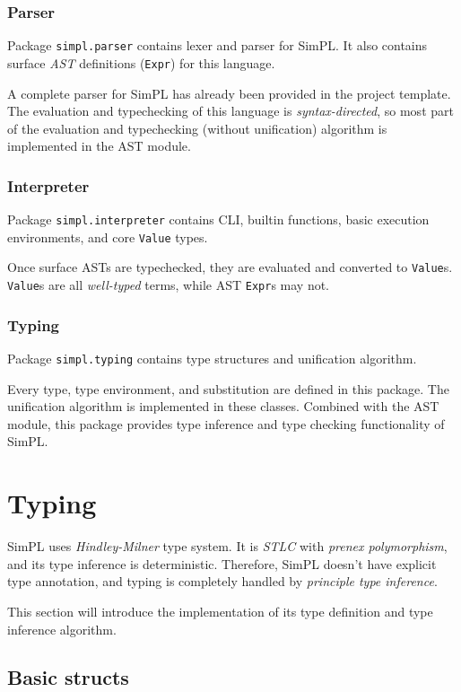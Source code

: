 \documentclass[a4paper]{article}
\begin{document}
\subsubsection{Parser}
Package \texttt{simpl.parser} contains lexer and parser for SimPL. It also contains surface \textit{AST} definitions (\texttt{Expr}) for this language.

A complete parser for SimPL has already been provided in the project template.
The evaluation and typechecking of this language is \textit{syntax-directed}, so most part of the evaluation and typechecking (without unification) algorithm is implemented in the AST module.

\subsubsection{Interpreter}
Package \texttt{simpl.interpreter} contains CLI, builtin functions, basic execution environments, and core \texttt{Value} types.

Once surface ASTs are typechecked, they are evaluated and converted to \texttt{Value}s. \texttt{Value}s are all \textit{well-typed} terms, while AST \texttt{Expr}s may not.

\subsubsection{Typing}

Package \texttt{simpl.typing} contains type structures and unification algorithm.

Every type, type environment, and substitution are defined in this package. The unification algorithm is implemented in these classes. Combined with the AST module, this package provides type inference and type checking functionality of SimPL.

\section{Typing}

SimPL uses \textit{Hindley-Milner} type system. It is \textit{STLC} with \textit{prenex polymorphism}, and its type inference is deterministic. Therefore, SimPL doesn't have explicit type annotation, and typing is completely handled by \textit{principle type inference}.

This section will introduce the implementation of its type definition and type inference algorithm.

\subsection{Basic structs}
\end{document}

